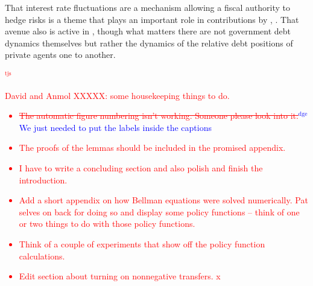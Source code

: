 \documentclass[12pt]{article}
\newcommand{\dge}[1]{\textcolor{blue}{$^{\textrm{dge}}${#1}}}
\newcommand{\tjs}[1]{\textcolor{red}{$^{\textrm{tjs}}${#1}}}
\begin{document}
  That interest rate fluctuations are a mechanism allowing a fiscal authority to hedge risks is a theme that plays an important role in
   contributions by \citet{Faraglia2011}, \citet{BerndtLustigYeltekin}.  That avenue also is active in 
\citet{BEGS1}, though what matters there are not government debt dynamics themselves but rather the dynamics of the relative debt positions
of private agents one to another.  



\tjs{David and Anmol XXXXX: some housekeeping things to do.
\begin{itemize}
\item \st{The automatic figure numbering isn't working.  Someone please look into it.}\dge{We just needed to put the labels inside the captions}
\item The proofs of the lemmas should be included in the promised appendix.
\item I have to write a concluding section and also polish and finish the introduction.
\item Add a short appendix on how Bellman equations were solved numerically. Pat selves on back for doing so and display
some policy functions -- think of one or two things to do with those policy functions.
\item Think of a couple of experiments that show off the policy function calculations.
\item  Edit  section about turning on nonnegative transfers.
x\end{itemize}}




\end{document}

